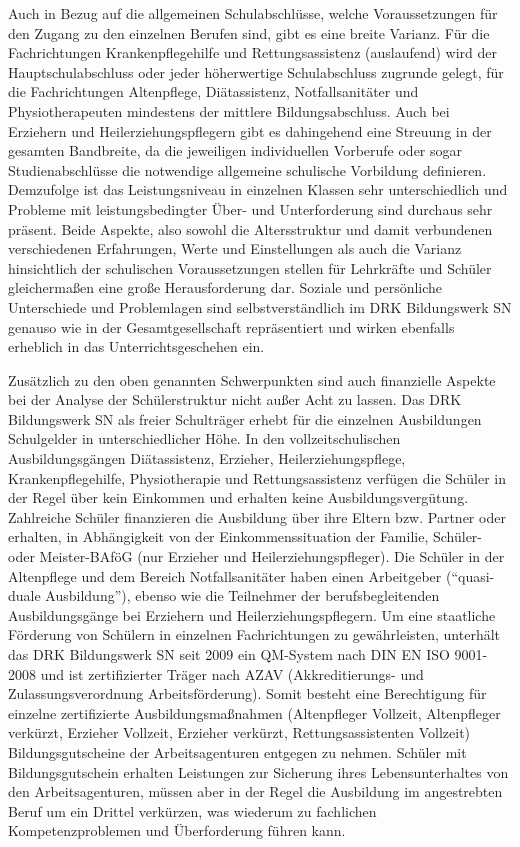Auch in Bezug auf die allgemeinen Schulabschlüsse, welche Voraussetzungen für den Zugang zu den einzelnen Berufen sind, gibt es eine breite Varianz. Für die Fachrichtungen Krankenpflegehilfe und Rettungsassistenz (auslaufend) wird der Hauptschulabschluss oder jeder höherwertige Schulabschluss zugrunde gelegt, für die Fachrichtungen Altenpflege, Diätassistenz, Notfallsanitäter und Physiotherapeuten mindestens der mittlere Bildungsabschluss. Auch bei Erziehern und Heilerziehungspflegern gibt es dahingehend eine Streuung in der gesamten Bandbreite, da die jeweiligen individuellen Vorberufe oder sogar Studienabschlüsse die notwendige allgemeine schulische Vorbildung definieren. Demzufolge ist das Leistungsniveau in einzelnen Klassen sehr unterschiedlich und Probleme mit leistungsbedingter Über- und Unterforderung sind durchaus sehr präsent. Beide Aspekte, also sowohl die Altersstruktur und damit verbundenen verschiedenen Erfahrungen, Werte und Einstellungen als auch die Varianz hinsichtlich der schulischen Voraussetzungen stellen für Lehrkräfte und Schüler gleichermaßen eine große Herausforderung dar. Soziale und persönliche Unterschiede und Problemlagen sind selbstverständlich im DRK Bildungswerk SN genauso wie in der Gesamtgesellschaft repräsentiert und wirken ebenfalls erheblich in das Unterrichtsgeschehen ein. 

Zusätzlich zu den oben genannten Schwerpunkten sind auch finanzielle Aspekte bei der Analyse der Schülerstruktur nicht außer Acht zu lassen. Das DRK Bildungswerk SN als freier Schulträger erhebt für die einzelnen Ausbildungen Schulgelder in unterschiedlicher Höhe. In den vollzeitschulischen Ausbildungsgängen Diätassistenz, Erzieher, Heilerziehungspflege, Krankenpflegehilfe, Physiotherapie und Rettungsassistenz verfügen die Schüler in der Regel über kein Einkommen und erhalten keine Ausbildungsvergütung. Zahlreiche Schüler finanzieren die Ausbildung über ihre Eltern bzw. Partner oder erhalten, in Abhängigkeit von der Einkommenssituation der Familie, Schüler- oder Meister-BAföG (nur Erzieher und Heilerziehungspfleger). Die Schüler in der Altenpflege und dem Bereich Notfallsanitäter haben einen Arbeitgeber ("`quasi-duale Ausbildung"'), ebenso wie die Teilnehmer der berufsbegleitenden Ausbildungsgänge bei Erziehern und Heilerziehungspflegern. Um eine staatliche Förderung von Schülern in einzelnen Fachrichtungen zu gewährleisten, unterhält das DRK Bildungswerk SN seit 2009 ein QM-System nach DIN EN ISO 9001-2008 und ist zertifizierter Träger nach AZAV (Akkreditierungs- und Zulassungsverordnung Arbeitsförderung). Somit besteht eine Berechtigung für einzelne zertifizierte Ausbildungsmaßnahmen (Altenpfleger Vollzeit, Altenpfleger verkürzt, Erzieher Vollzeit, Erzieher verkürzt, Rettungsassistenten Vollzeit) Bildungsgutscheine der Arbeitsagenturen entgegen zu nehmen. Schüler mit Bildungsgutschein erhalten Leistungen zur Sicherung ihres Lebensunterhaltes von den Arbeitsagenturen, müssen aber in der Regel die Ausbildung im angestrebten Beruf um ein Drittel verkürzen, was wiederum zu fachlichen Kompetenzproblemen und Überforderung führen kann.

